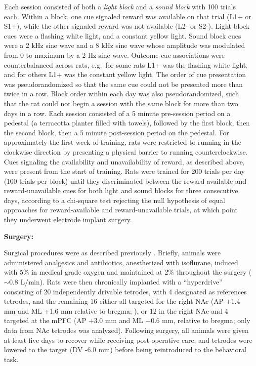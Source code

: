 \documentclass[11pt]{article}
\let\cite=\citep
\let\citeNP=\citealt
\begin{document}
Each session consisted of both a {\it light block} and a {\it sound block} with
100 trials each. Within a block, one cue signaled reward was available on that
trial (L1+ or S1+), while the other signaled reward was not available (L2- or
S2-). Light block cues were a flashing white light, and a constant yellow
light. Sound block cues were a 2 kHz sine wave and a 8 kHz sine wave whose
amplitude was modulated from 0 to maximum by a 2 Hz sine wave. Outcome-cue
associations were counterbalanced across rats, e.g.\ for some rats L1+ was the
flashing white light, and for others L1+ was the constant yellow light. The
order of cue presentation was pseudorandomized so that the same cue could not be
presented more than twice in a row. Block order within each day was also
pseudorandomized, such that the rat could not begin a session with the same
block for more than two days in a row. Each session consisted of a 5 minute
pre-session period on a pedestal (a terracotta planter filled with towels),
followed by the first block, then the second block, then a 5 minute post-session
period on the pedestal. For approximately the first week of training, rats were restricted to
running in the clockwise direction by presenting a physical barrier to
running counterclockwise. Cues signaling the availability and
unavailability of reward, as described above, were present from the
start of training. Rats were trained for 200 trials per day (100
trials per block) until they discriminated between the reward-available and reward-unavailable cues for both light and
sound blocks for three consecutive days, according to a chi-square test
rejecting the null hypothesis of equal approaches for reward-available and
reward-unavailable trials, at which point they underwent electrode implant
surgery.

{\bf Surgery:}

Surgical procedures were as described previously
\cite{Malhotra2015}. Briefly, animals were administered analgesics and
antibiotics, anesthetized with isoflurane, induced with 5\% in medical
grade oxygen and maintained at 2\% throughout the surgery ($\sim$0.8
L/min). Rats were then chronically implanted with a ``hyperdrive''
consisting of 20 independently drivable tetrodes, with 4 designated as references tetrodes, and the remaining 16
either all targeted for the right NAc (AP +1.4 mm and ML +1.6 mm relative to
bregma; \citeNP{atlas}), or 12 in the right NAc and 4 targeted at the
mPFC (AP +3.0 mm and ML +0.6 mm, relative to bregma; only data from
NAc tetrodes was analyzed). Following surgery, all animals were given
at least five days to recover while receiving post-operative care, and
tetrodes were lowered to the target (DV -6.0 mm) before being
reintroduced to the behavioral task.
\end{document}
